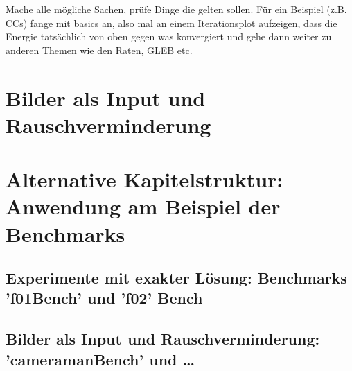 Mache alle mögliche Sachen, prüfe Dinge die gelten sollen. Für ein
Beispiel (z.B. CCs) fange mit basics an, also mal an einem Iterationsplot
aufzeigen, dass die Energie tatsächlich von oben gegen was konvergiert und 
gehe dann weiter zu anderen Themen wie den Raten, GLEB etc.

\section{Bilder als Input und Rauschverminderung}
\section{Alternative Kapitelstruktur: Anwendung am Beispiel der Benchmarks}
\subsection{Experimente mit exakter Lösung: Benchmarks 'f01Bench' und 'f02'
Bench}

\subsection{Bilder als Input und Rauschverminderung: 'cameramanBench' und
\ldots}
